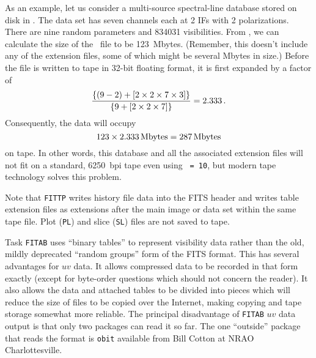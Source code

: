      As an example, let us consider a multi-source spectral-line
database stored on disk in .  The data set has
seven channels each at 2 IFs with 2 polarizations.  There are nine
random parameters and 834031 visibilities.  From , we can
calculate the size of the \uv\ file to be 123~Mbytes.  (Remember, this
doesn't include any of the extension files, some of which might be
several Mbytes in size.)   Before the file is written to tape in
32-bit floating format, it is first expanded by a factor of
$$
 {\lbrace (9 - 2) + \lbrack 2 \times 2 \times
                                      7 \times 3 \rbrack \rbrace
\over
\lbrace 9 + \lbrack 2 \times 2 \times 7 \rbrack \rbrace}  = 2.333 \, .
$$
Consequently, the data will occupy
$$
   {{123 \times 2.333}} \rm\, Mbytes  = 287\rm\, Mbytes
$$
on tape.  In other words, this database and all the associated
extension files will not fit on a standard, 6250~bpi tape even using
{\tt {} = 10}, but modern tape technology solves this
problem.

     Note that {\tt FITTP} writes history file data into the FITS
header and writes table extension files as extensions after the main
image or data set within the same tape file.  Plot ({\tt PL}) and
slice ({\tt SL}) files are not saved to tape.

    Task {\tt FITAB} uses ``binary tables'' to represent visibility
data rather than the old, mildly deprecated ``random groups'' form of
the FITS format.  This has several advantages for $uv$ data.  It
allows compressed data to be recorded in that form exactly (except for
byte-order questions which should not concern the reader).  It also
allows the data and attached tables to be divided into pieces which
will reduce the size of files to be copied over the Internet, making
copying and tape storage somewhat more reliable.  The principal
disadvantage of {\tt FITAB} $uv$ data output is that only two packages
can read it so far.  The one ``outside'' package that reads the format
is {\tt obit} available from Bill Cotton at NRAO Charlottesville.



